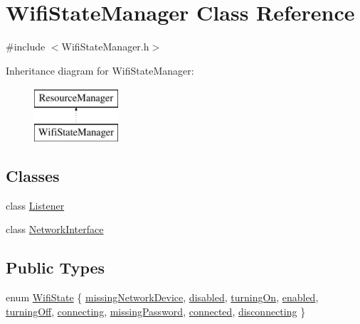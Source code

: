 \hypertarget{classWifiStateManager}{}\section{Wifi\+State\+Manager Class Reference}
\label{classWifiStateManager}


{\ttfamily \#include $<$Wifi\+State\+Manager.\+h$>$}

Inheritance diagram for Wifi\+State\+Manager\+:\begin{figure}[H]
\begin{center}
\leavevmode
\includegraphics[height=2.000000cm]{classWifiStateManager}
\end{center}
\end{figure}
\subsection*{Classes}
\begin{DoxyCompactItemize}
\item 
class \mbox{\hyperlink{classWifiStateManager_1_1Listener}{Listener}}
\item 
class \mbox{\hyperlink{classWifiStateManager_1_1NetworkInterface}{Network\+Interface}}
\end{DoxyCompactItemize}
\subsection*{Public Types}
\begin{DoxyCompactItemize}
\item 
enum \mbox{\hyperlink{classWifiStateManager_a1b2ed840606c57c43d4a147c96d43128}{Wifi\+State}} \{ \newline
\mbox{\hyperlink{classWifiStateManager_a1b2ed840606c57c43d4a147c96d43128aaf6835318c8e72765b43b3487628eabe}{missing\+Network\+Device}}, 
\mbox{\hyperlink{classWifiStateManager_a1b2ed840606c57c43d4a147c96d43128a4c18c29c9ec0749f510463427365c56e}{disabled}}, 
\mbox{\hyperlink{classWifiStateManager_a1b2ed840606c57c43d4a147c96d43128a44e5d935f050124acc73a2177f3e524e}{turning\+On}}, 
\mbox{\hyperlink{classWifiStateManager_a1b2ed840606c57c43d4a147c96d43128a292ad674a3e4c1c2e25bbfd75c8f4990}{enabled}}, 
\newline
\mbox{\hyperlink{classWifiStateManager_a1b2ed840606c57c43d4a147c96d43128ab2430c208f31254e8cdd500ed6a46865}{turning\+Off}}, 
\mbox{\hyperlink{classWifiStateManager_a1b2ed840606c57c43d4a147c96d43128ae8e4af87cb25570824892ec4cbcc8126}{connecting}}, 
\mbox{\hyperlink{classWifiStateManager_a1b2ed840606c57c43d4a147c96d43128a54084ea67e7266e56e6a4a4688612cec}{missing\+Password}}, 
\mbox{\hyperlink{classWifiStateManager_a1b2ed840606c57c43d4a147c96d43128a7901a3e7a2f6944e601af0738a2411b6}{connected}}, 
\newline
\mbox{\hyperlink{classWifiStateManager_a1b2ed840606c57c43d4a147c96d43128a58c4316b3bdc8fbc0b67992ce11f9925}{disconnecting}}
 \}
\end{DoxyCompactItemize}
